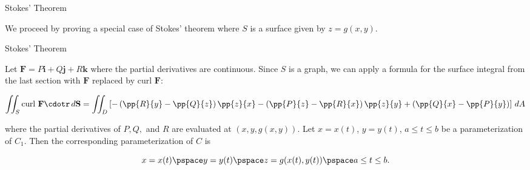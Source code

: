 \documentclass[11pt,english,
handout
]{beamer}
\begin{document}
\begin{frame}[t]{Stokes' Theorem}
\small
\begin{proofs}
We proceed by proving a special case of Stokes' theorem where $S$ is a surface given by $z=g(x,y)$.   

\end{proofs}
\end{frame}




\begin{frame}[t]{Stokes' Theorem}
\small
\begin{proofs}
Let $\mathbf{F}=P\mathbf{i}+Q\mathbf{j}+R\mathbf{k}$ where the partial derivatives are continuous. \pause Since $S$ is a graph, we can apply a formula for the surface integral from the last section with $\mathbf{F}$ replaced by curl $\mathbf{F}$:

{\footnotesize
\[
\iint_S\text{curl }\mathbf{F}\cdotr\,d\mathbf{S}=\iint_D\left[-\left(\pp{R}{y}-\pp{Q}{z}\right)\pp{z}{x}-\left(\pp{P}{z}-\pp{R}{x}\right)\pp{z}{y}+\left(\pp{Q}{x}-\pp{P}{y}\right)\right]\,dA
\]
}
 
where the partial derivatives of $P,Q,$ and $R$ are evaluated at $(x,y,g(x,y))$. \pause Let $x=x(t)$, $y=y(t)$, $a\leq t\leq b$ be a parameterization of $C_1$. Then the corresponding parameterization of $C$ is

\[
x=x(t)\pspace y=y(t)\pspace z=g(x(t),y(t))\pspace a\leq t\leq b.
\]
\end{proofs}
\end{frame}
\end{document}
